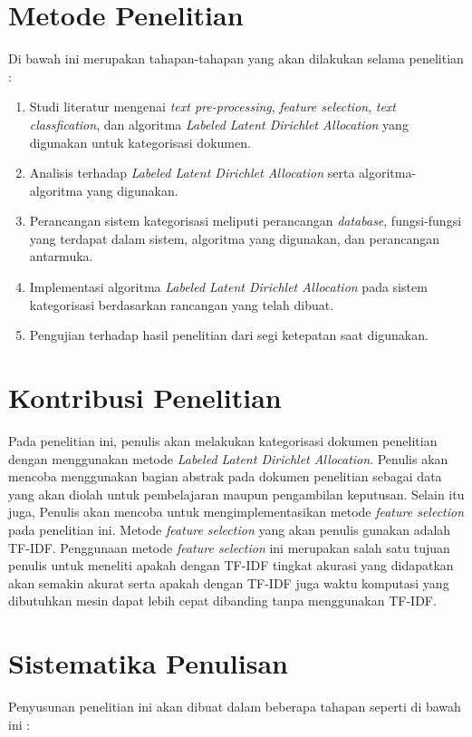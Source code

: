 \section{Metode Penelitian}
\indent Di bawah ini merupakan tahapan-tahapan yang akan dilakukan selama penelitian :

\begin{enumerate}[nolistsep,leftmargin=0.5cm]
\item
Studi literatur mengenai {\itshape text pre-processing}, {\itshape feature selection}, {\itshape text classfication}, dan algoritma {\itshape Labeled Latent Dirichlet Allocation} yang digunakan untuk kategorisasi dokumen.
\item
Analisis terhadap {\itshape Labeled Latent Dirichlet Allocation} serta algoritma-algoritma yang digunakan.
\item
Perancangan sistem kategorisasi meliputi perancangan {\itshape database}, fungsi-fungsi yang terdapat dalam sistem, algoritma yang digunakan, dan perancangan antarmuka.
\item
Implementasi algoritma {\itshape Labeled Latent Dirichlet Allocation} pada sistem kategorisasi berdasarkan rancangan yang telah dibuat.
\item
Pengujian terhadap hasil penelitian dari segi ketepatan saat digunakan.
\end{enumerate}

\section{Kontribusi Penelitian}
\indent
Pada penelitian ini, penulis akan melakukan kategorisasi dokumen penelitian dengan menggunakan metode {\itshape Labeled Latent Dirichlet Allocation}.  Penulis akan mencoba menggunakan bagian abstrak pada dokumen penelitian sebagai data yang akan diolah untuk pembelajaran maupun pengambilan keputusan. Selain itu juga, Penulis akan mencoba untuk mengimplementasikan metode {\itshape feature selection} pada penelitian ini. Metode {\itshape feature selection} yang akan penulis gunakan adalah TF-IDF. Penggunaan metode {\itshape feature selection} ini merupakan salah satu tujuan penulis untuk meneliti apakah dengan TF-IDF tingkat akurasi yang didapatkan akan semakin akurat serta apakah dengan TF-IDF juga waktu komputasi yang dibutuhkan mesin dapat lebih cepat dibanding tanpa menggunakan TF-IDF.

\section{Sistematika Penulisan}
\indent 
Penyusunan penelitian ini akan dibuat dalam beberapa tahapan seperti di bawah ini :

